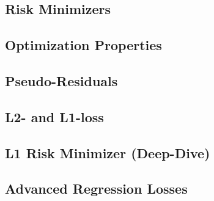 

\subsection{Risk Minimizers}


\subsection{Optimization Properties}


\subsection{Pseudo-Residuals}


\subsection{L2- and L1-loss}


\subsection{L1 Risk Minimizer (Deep-Dive)}


\subsection{Advanced Regression Losses}


